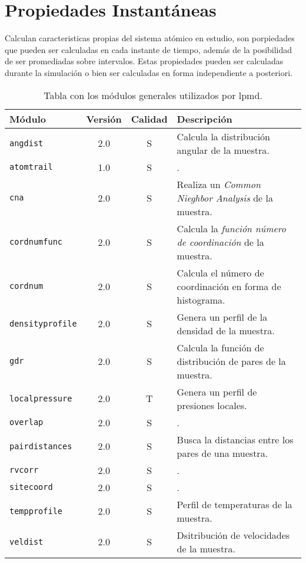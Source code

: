 \section{Propiedades Instant\'aneas}
Calculan caracteristicas propias del sistema at\'omico en estudio, son porpiedades que pueden ser calculadas en cada instante de tiempo, además de la posibilidad de ser promediadas sobre intervalos. Estas propiedades pueden ser calculadas durante la simulaci\'on o bien ser calculadas en forma independiente a posteriori.

\begin{table}[h!]\centering
 \begin{tabular}{|l|c|c|p{10cm}|}\hline
 M\'odulo & Versi\'on & Calidad & Descripci\'on \\
 \hline
 \texttt{angdist} & 2.0 & S & Calcula la distribuci\'on angular de la muestra.\\
 \hline
 \texttt{atomtrail} & 1.0 & S & .\\
 \hline
 \texttt{cna} & 2.0 & S & Realiza un \textit{Common Nieghbor Analysis} de la muestra.\\
 \hline
 \texttt{cordnumfunc} & 2.0 & S & Calcula la \textit{funci\'on n\'umero de coordinaci\'on} de la muestra.\\
 \hline
 \texttt{cordnum} & 2.0 & S & Calcula el n\'umero de coordinaci\'on en forma de histograma.\\
 \hline
 \texttt{densityprofile} & 2.0 & S & Genera un perfil de la densidad de la muestra.\\
 \hline
 \texttt{gdr} & 2.0 & S & Calcula la funci\'on de distribuci\'on de pares de la muestra.\\
 \hline
 \texttt{localpressure} & 2.0 & T & Genera un perfil de presiones locales.\\
 \hline
 \texttt{overlap} & 2.0 & S & .\\
 \hline
 \texttt{pairdistances} & 2.0 & S & Busca la distancias entre los pares de una muestra.\\
 \hline
 \texttt{rvcorr} & 2.0 & S & .\\
 \hline
 \texttt{sitecoord} & 2.0 & S & .\\
 \hline
 \texttt{tempprofile} & 2.0 & S & Perfil de temperaturas de la muestra.\\
 \hline
 \texttt{veldist} & 2.0 & S & Dsitribuci\'on de velocidades de la muestra.\\
 \hline
 \end{tabular}
\label{tab:modproper}
\caption{Tabla con los m\'odulos generales utilizados por lpmd.}
\end{table}

